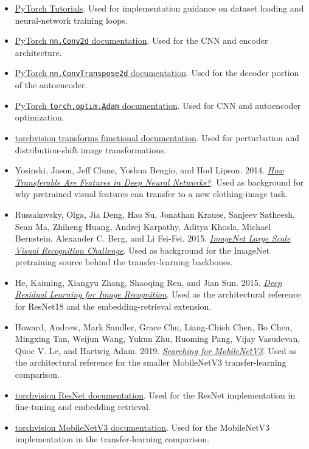 \documentclass[11pt]{article}
\providecommand{\tightlist}{%
      \setlength{\itemsep}{0pt}\setlength{\parskip}{0pt}}
\begin{document}
\begin{itemize}
\tightlist
\item
  \href{https://pytorch.org/tutorials/}{PyTorch Tutorials}. Used for
  implementation guidance on dataset loading and neural-network training
  loops.
\item
  \href{https://pytorch.org/docs/stable/generated/torch.nn.Conv2d.html}{PyTorch
  \texttt{nn.Conv2d} documentation}. Used for the CNN and encoder
  architecture.
\item
  \href{https://pytorch.org/docs/stable/generated/torch.nn.ConvTranspose2d.html}{PyTorch
  \texttt{nn.ConvTranspose2d} documentation}. Used for the decoder
  portion of the autoencoder.
\item
  \href{https://pytorch.org/docs/stable/generated/torch.optim.Adam.html}{PyTorch
  \texttt{torch.optim.Adam} documentation}. Used for CNN and autoencoder
  optimization.
\item
  \href{https://pytorch.org/vision/stable/transforms.html}{torchvision
  transforms functional documentation}. Used for perturbation and
  distribution-shift image transformations.
\item
  Yosinski, Jason, Jeff Clune, Yoshua Bengio, and Hod Lipson. 2014.
  \href{https://papers.nips.cc/paper/5347-how-transferable-are-features-in-deep-neural-networks}{\emph{How
  Transferable Are Features in Deep Neural Networks?}}. Used as
  background for why pretrained visual features can transfer to a new
  clothing-image task.
\item
  Russakovsky, Olga, Jia Deng, Hao Su, Jonathan Krause, Sanjeev
  Satheesh, Sean Ma, Zhiheng Huang, Andrej Karpathy, Aditya Khosla,
  Michael Bernstein, Alexander C. Berg, and Li Fei-Fei. 2015.
  \href{https://arxiv.org/abs/1409.0575}{\emph{ImageNet Large Scale
  Visual Recognition Challenge}}. Used as background for the ImageNet
  pretraining source behind the transfer-learning backbones.
\item
  He, Kaiming, Xiangyu Zhang, Shaoqing Ren, and Jian Sun. 2015.
  \href{https://arxiv.org/abs/1512.03385}{\emph{Deep Residual Learning
  for Image Recognition}}. Used as the architectural reference for
  ResNet18 and the embedding-retrieval extension.
\item
  Howard, Andrew, Mark Sandler, Grace Chu, Liang-Chieh Chen, Bo Chen,
  Mingxing Tan, Weijun Wang, Yukun Zhu, Ruoming Pang, Vijay Vasudevan,
  Quoc V. Le, and Hartwig Adam. 2019.
  \href{https://arxiv.org/abs/1905.02244}{\emph{Searching for
  MobileNetV3}}. Used as the architectural reference for the smaller
  MobileNetV3 transfer-learning comparison.
\item
  \href{https://pytorch.org/vision/stable/models/resnet.html}{torchvision
  ResNet documentation}. Used for the ResNet implementation in
  fine-tuning and embedding retrieval.
\item
  \href{https://pytorch.org/vision/stable/models/mobilenetv3.html}{torchvision
  MobileNetV3 documentation}. Used for the MobileNetV3 implementation in
  the transfer-learning comparison.
\end{itemize}
\end{document}
